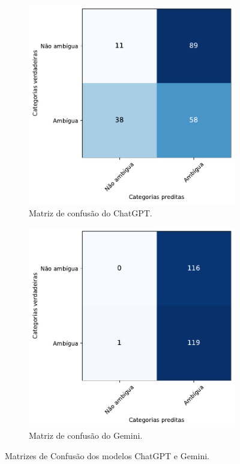 \begin{figure}[htb]
    \centering
    \begin{subfigure}[b]{0.45\textwidth}
        \includegraphics[width=\textwidth]{matriz_confusao_ChatGPT.pdf}
        \caption{Matriz de confusão do ChatGPT.}
        \label{fig:matriz_confusao_chatgpt}
    \end{subfigure}
    \hfill
    \begin{subfigure}[b]{0.45\textwidth}
        \includegraphics[width=\textwidth]{matriz_confusao_Bard.pdf}
        \caption{Matriz de confusão do Gemini.}
        \label{fig:matriz_confusao_bard}
    \end{subfigure}
    \caption{Matrizes de Confusão dos modelos ChatGPT e Gemini.}
    \label{fig:matriz_confusao_1}
\end{figure}

